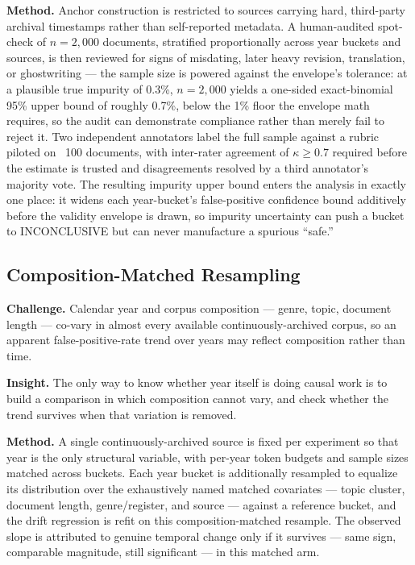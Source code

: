 \documentclass[conference]{IEEEtran}
\begin{document}
\textbf{Method.} Anchor construction is restricted to sources carrying hard, third-party archival timestamps rather than self-reported metadata. A human-audited spot-check of $n=2{,}000$ documents, stratified proportionally across year buckets and sources, is then reviewed for signs of misdating, later heavy revision, translation, or ghostwriting --- the sample size is powered against the envelope's tolerance: at a plausible true impurity of 0.3\%, $n=2{,}000$ yields a one-sided exact-binomial 95\% upper bound of roughly 0.7\%, below the 1\% floor the envelope math requires, so the audit can demonstrate compliance rather than merely fail to reject it. Two independent annotators label the full sample against a rubric piloted on ~100 documents, with inter-rater agreement of $\kappa \geq 0.7$ required before the estimate is trusted and disagreements resolved by a third annotator's majority vote. The resulting impurity upper bound enters the analysis in exactly one place: it widens each year-bucket's false-positive confidence bound additively before the validity envelope is drawn, so impurity uncertainty can push a bucket to INCONCLUSIVE but can never manufacture a spurious ``safe.''

\subsection{Composition-Matched Resampling}

\textbf{Challenge.} Calendar year and corpus composition --- genre, topic, document length --- co-vary in almost every available continuously-archived corpus, so an apparent false-positive-rate trend over years may reflect composition rather than time.

\textbf{Insight.} The only way to know whether year itself is doing causal work is to build a comparison in which composition cannot vary, and check whether the trend survives when that variation is removed.

\textbf{Method.} A single continuously-archived source is fixed per experiment so that year is the only structural variable, with per-year token budgets and sample sizes matched across buckets. Each year bucket is additionally resampled to equalize its distribution over the exhaustively named matched covariates --- topic cluster, document length, genre/register, and source --- against a reference bucket, and the drift regression is refit on this composition-matched resample. The observed slope is attributed to genuine temporal change only if it survives --- same sign, comparable magnitude, still significant --- in this matched arm.
\end{document}

